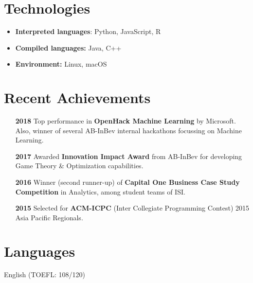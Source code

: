 \documentclass[margin]{res}
\begin{document}
\begin{resume}
\section{Technologies}
\begin{itemize} 
\item \textbf{Interpreted languages}: Python, JavaScript, R
\item \textbf{Compiled languages:} Java, C++
\item \textbf{Environment:} Linux, macOS
\end{itemize}




\section{Recent Achievements}
\begin{itemize}
\item[\textbf{2018}] Top performance in \textbf{OpenHack Machine Learning} by Microsoft. Also, winner of several AB-InBev internal hackathons focussing on Machine Learning.\\
\item[\textbf{2017}] Awarded \textbf{Innovation Impact Award} from AB-InBev for developing Game Theory \& Optimization capabilities.\\
\item[\textbf{2016}] Winner (second runner-up) of \textbf{Capital One Business Case Study Competition} in Analytics, among student teams of ISI.\\
\item[\textbf{2015}] Selected for \textbf{ACM-ICPC} (Inter Collegiate Programming Contest) 2015 Asia Pacific Regionals.\\
\end{itemize}




\section{Languages} English (TOEFL: 108/120)




\end{resume} 
\end{document}
